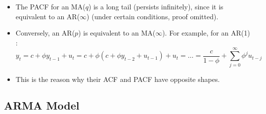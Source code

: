 \documentclass[notitlepage]{article}
\begin{document}
\begin{itemize}
\[    \]
    For \(j=1\):
    \[
    \gamma_1 = \mathbb{E}[y_ty_{t-1}] = \theta\sigma^2 
    \]
    And \(\gamma_j = 0\) for all \(j \ge 2\). Dividing both sides by \(\gamma_0\), the ACF is simply:
    \[
    \rho_j = \frac{\gamma_j}{\gamma_0} =
    \begin{cases}
        \frac{\theta}{1+\theta^2} &\text{if } j=1 \\
        0 & \text{otherwise}
    \end{cases}
    \]
    \item The PACF for an MA(\(q\)) is a long tail (persists infinitely), since it is equivalent to an AR(\(\infty\)) (under certain conditions, proof omitted).
    \item Conversely, an AR(\(p\)) is equivalent to an MA(\(\infty\)). For example, for an AR(1) :
    \[
    y_t = c+ \phi y_{t-1} + u_t = c+ \phi (c+ \phi y_{t-2} + u_{t-1}) + u_t = \dots = \frac{c}{1-\phi} + \sum_{j=0}^\infty \phi^j u_{t-j}
    \]
    \item This is the reason why their ACF and PACF have opposite shapes.
\end{itemize}

\subsection{ARMA Model}
\end{document}
